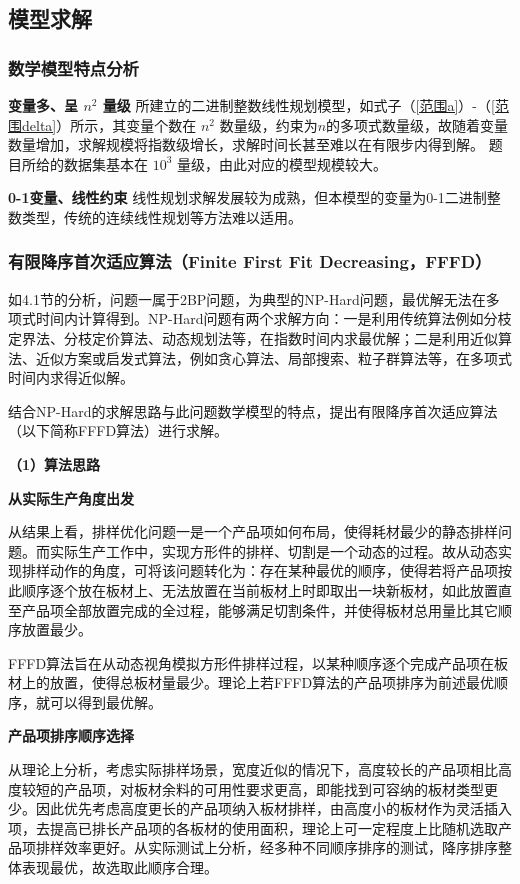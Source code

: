 \documentclass[bwprint]{gmcmthesis}
\begin{document}
\subsection{模型求解}
	
\subsubsection{数学模型特点分析}

	\textbf{变量多、呈 $ n^2 $ 量级} \quad 所建立的二进制整数线性规划模型，如式子（\ref{范围a}）-（\ref{范围delta}）所示，其变量个数在 $ n^2 $ 数量级，约束为$ n $的多项式数量级，故随着变量数量增加，求解规模将指数级增长，求解时间长甚至难以在有限步内得到解。 题目所给的数据集基本在 $ 10^3 $ 量级，由此对应的模型规模较大。
	
	\textbf{0-1变量、线性约束} \quad 线性规划求解发展较为成熟，但本模型的变量为0-1二进制整数类型，传统的连续线性规划等方法难以适用。
	

\subsubsection{有限降序首次适应算法（Finite First Fit Decreasing，FFFD）}
	
	如4.1节的分析，问题一属于2BP问题，为典型的NP-Hard问题，最优解无法在多项式时间内计算得到。NP-Hard问题有两个求解方向：一是利用传统算法例如分枝定界法、分枝定价算法、动态规划法等，在指数时间内求最优解；二是利用近似算法、近似方案或启发式算法，例如贪心算法、局部搜索、粒子群算法等，在多项式时间内求得近似解。
	
	结合NP-Hard的求解思路与此问题数学模型的特点，提出有限降序首次适应算法（以下简称FFFD算法）进行求解。
	
	\textbf{（1）算法思路}	
	
	\textbf{从实际生产角度出发}	
	
	从结果上看，排样优化问题一是一个产品项如何布局，使得耗材最少的静态排样问题。而实际生产工作中，实现方形件的排样、切割是一个动态的过程。故从动态实现排样动作的角度，可将该问题转化为：存在某种最优的顺序，使得若将产品项按此顺序逐个放在板材上、无法放置在当前板材上时即取出一块新板材，如此放置直至产品项全部放置完成的全过程，能够满足切割条件，并使得板材总用量比其它顺序放置最少。
	
	FFFD算法旨在从动态视角模拟方形件排样过程，以某种顺序逐个完成产品项在板材上的放置，使得总板材量最少。理论上若FFFD算法的产品项排序为前述最优顺序，就可以得到最优解。
	
	\textbf{产品项排序顺序选择}		
	
	从理论上分析，考虑实际排样场景，宽度近似的情况下，高度较长的产品项相比高度较短的产品项，对板材余料的可用性要求更高，即能找到可容纳的板材类型更少。因此优先考虑高度更长的产品项纳入板材排样，由高度小的板材作为灵活插入项，去提高已排长产品项的各板材的使用面积，理论上可一定程度上比随机选取产品项排样效率更好。从实际测试上分析，经多种不同顺序排序的测试，降序排序整体表现最优，故选取此顺序合理。
	
\end{document}
